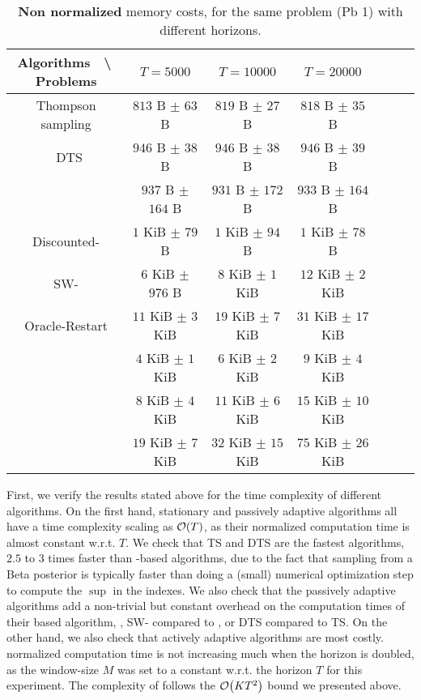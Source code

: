 \begin{small} %
\begin{table}[ht]
    \begin{small} %
    \centering
    \begin{tabular}{c|cccccc}
    \textbf{Algorithms} $\;$ \textbackslash $\;$ \textbf{Problems} & $T=5000$ & $T=10000$ & $T=20000$ \\
        \hline
        Thompson sampling & $813$ B $\pm$ $63$ B & $819$ B $\pm$ 27 B & $818$ B $\pm$ $35$ B \\\
        DTS & $946$ B $\pm$ $38$ B & $946$ B $\pm$ $38$ B & $946$ B $\pm$ $39$ B \\
        \hline
        \klUCB{} & $937$ B $\pm$ $164$ B & $931$ B $\pm$ $172$ B & $933$ B $\pm$ $164$ B \\
        Discounted-\klUCB{} & $1$ KiB $\pm$ $79$ B & $1$ KiB $\pm$ $94$ B & $1$ KiB $\pm$ $78$ B \\
        SW-\klUCB{} & $6$ KiB $\pm$ $976$ B & $8$ KiB $\pm$ $1$ KiB & $12$ KiB $\pm$ $2$ KiB \\
        \hline
        Oracle-Restart \klUCB{} & $11$ KiB $\pm$ $3$ KiB & $19$ KiB $\pm$ $7$ KiB & $31$ KiB $\pm$ $17$ KiB \\
        \hline
        \MklUCB{} & $4$ KiB $\pm$ $1$ KiB & $6$ KiB $\pm$ $2$ KiB & $9$ KiB $\pm$ $4$ KiB \\
        \CUSUMklUCB{} & $8$ KiB $\pm$ $4$ KiB & $11$ KiB $\pm$ $6$ KiB & $15$ KiB $\pm$ $10$ KiB \\
        \GLRklUCB{} & $19$ KiB $\pm$ $7$ KiB & $32$ KiB $\pm$ $15$ KiB & $75$ KiB $\pm$ $26$ KiB
    \end{tabular}
    \caption{\textbf{Non normalized} memory costs, for the same problem (Pb 1) with different horizons.}
    \label{table:6:MemoryCosts}
    \end{small} %
\end{table}
\end{small} %


First, we verify the results stated above for the time complexity of different algorithms.
On the first hand, stationary and passively adaptive algorithms all have a time complexity scaling as $\mathop{}\mathopen{}\mathcal{O}\mathopen{}\left(T\right)$, as their normalized computation time is almost constant w.r.t. $T$.
We check that TS and DTS are the fastest algorithms, $2.5$ to $3$ times faster than \klUCB-based algorithms, due to the fact that sampling from a Beta posterior is typically faster than doing a (small) numerical optimization step to compute the $\sup$ in the \klUCB{} indexes.
We also check that the passively adaptive algorithms add a non-trivial but constant overhead on the computation times of their based algorithm, \eg, SW-\klUCB{} compared to \klUCB, or DTS compared to TS.
On the other hand, we also check that actively adaptive algorithms are most costly.
\MklUCB{} normalized computation time is not increasing much when the horizon is doubled, as the window-size $M$ was set to a constant w.r.t. the horizon $T$ for this experiment.
The complexity of \GLRklUCB{} follows the $\mathop{}\mathopen{}\mathcal{O}\mathopen{}\left(K T^2\right)$ bound we presented above.

